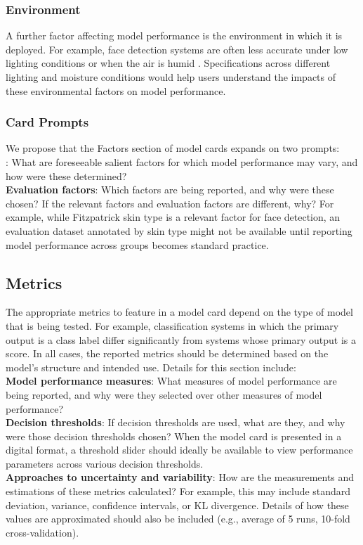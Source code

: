 \subsubsection{Environment}
A further factor affecting model performance is the environment in which it is deployed.  For example, face detection systems are often less accurate under low lighting conditions or when the air is humid \cite{light}. Specifications across different lighting and moisture conditions would help users understand the impacts of these environmental factors on model performance.

\subsubsection{Card Prompts}
We propose that the Factors section of model cards expands on two prompts: \\
:  What are foreseeable salient factors for which model performance may vary, and how were these determined? \\
{\bf Evaluation factors}:  Which factors are being reported, and why were these chosen?  If the relevant factors and evaluation factors are different, why? For example, while Fitzpatrick skin type is a relevant factor for face detection, an evaluation dataset annotated by skin type might not be available until reporting model performance across groups becomes standard practice.

\subsection{Metrics}\label{sec:metrics}
The appropriate metrics to feature in a model card depend on the type of model that is being tested. For example, classification systems in which the primary output is a class label differ significantly from systems whose primary output is a score.
In all cases, the reported metrics should be determined based on the model's structure and intended use. Details for this section include: \\
{\bf Model performance measures}:  What measures of model performance are being reported, and why were they selected over other measures of model performance?   \\
{\bf Decision thresholds}:  If decision thresholds are used, what are they, and why were those decision thresholds chosen?  When the model card is presented in a digital format, a threshold slider should ideally be available to view performance parameters across various decision thresholds.\\
{\bf Approaches to uncertainty and variability}:  How are the measurements and estimations of these metrics calculated? For example, this may include standard deviation, variance, confidence intervals, or KL divergence. Details of how these values are approximated should also be included (e.g., average of 5 runs, 10-fold cross-validation).
